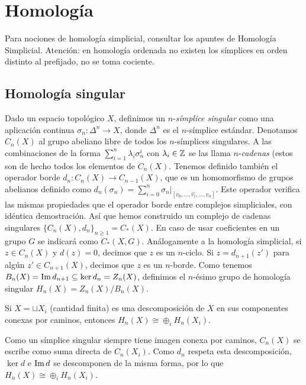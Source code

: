 \documentclass[TA.tex]{subfiles}
\begin{document}

\chapter{Homología}

Para nociones de homología simplicial, consultar los apuntes de Homología Simplicial. Atención: en homología ordenada no existen los símplices en orden distinto al prefijado, no se toma cociente. 
\section{Homología singular}

Dado un espacio topológico $X$, definimos un $n$-\emph{símplice singular} como una aplicación continua $\sigma_n:\Delta^n\to X$, donde $\Delta^n$ es el $n$-símplice estándar. Denotamos $C_n(X)$ al grupo abeliano libre de todos los $n$-símplices singulares. A las combinaciones de la forma $\sum_{i=1}^n\lambda_i\sigma_n^i$ con $\lambda_i\in\mathbb{Z}$ se las llama $n$-\emph{cadenas} (estos son de hecho todos los elementos de $C_n(X)$. Tenemos definido también el operador borde $d_n:C_n(X)\to C_{n-1}(X)$, que es un homomorfismo de grupos abelianos definido como $d_n(\sigma_n)=\sum_{i=0}^n \sigma_n|_{[v_0,\dots, \hat{v_i},\dots, v_n]}$. Este operador verifica las mismas propiedades que el operador borde entre complejos simpliciales, con idéntica demostración. Así que hemos construido un complejo de cadenas singulares $\{C_n(X), d_n\}_{n\geq 1}=C_*(X)$. En caso de usar coeficientes en un grupo $G$ se indicará como $C_*(X,G)$. Análogamente a la homología simplicial, si $z\in C_n(X)$ y $d(z)=0$, decimos que $z$ es un $n$-ciclo. Si $z=d_{n+1}(z')$ para algún $z'\in C_{n+1}(X)$, decimos que $z$ es un $n$-borde. Como tenemos $B_n(X)=\operatorname{Im} d_{n+1}\subseteq \ker d_n=Z_n(X)$, definimos el $n$-ésimo grupo de homología singular $H_n(X)=Z_n(X)/B_n(X)$. 


\begin{prop}
Si $X=\sqcup X_i$ (cantidad finita) es una descomposición de $X$ en sus componentes conexas por caminos, entonces $H_n(X)\cong \oplus_i H_n(X_i)$. 
\end{prop}
\begin{dem}
Como un símplice singular siempre tiene imagen conexa por caminos, $C_n(X)$ se escribe como suma directa de $C_n(X_i)$. Como $d_n$ respeta esta descomposición, $\ker d$ e $\operatorname{Im} d$ se descomponen de la misma forma, por lo que $H_n(X)\cong \oplus_i H_n(X_i)$. \QED
\end{dem}
\end{document}
